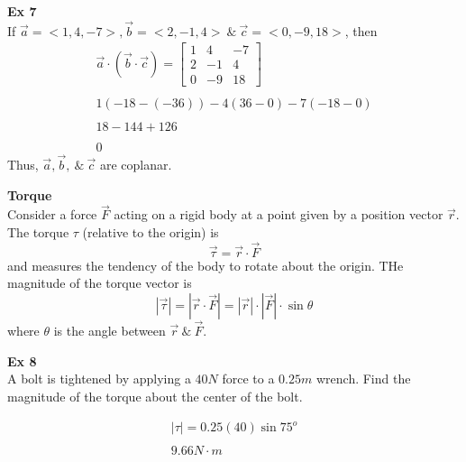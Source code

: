 \documentclass{article}
\begin{document}
    \textbf{Ex 7}\\
    If $ \vec{a} = < 1, 4, -7>, \vec{b}= < 2, -1, 4> ~\&~ \vec{c}= < 0, -9, 18>  $, then
    \[
      \begin{gathered}
      \vec{a} \cdot  (\vec{b} \cdot  \vec{c}) = 
      \begin{bmatrix}
        1 &4 &-7\\
        2 &-1 &4\\
        0 &-9 &18
      \end{bmatrix}\\
      ~\\
      1(-18-(-36))-4(36-0)-7(-18-0)\\
      ~\\
      18-144+126\\
      ~\\
      0
      \end{gathered}
    \]
    Thus, $ \vec{a}, \vec{b}, ~\&~\vec{c} $ are coplanar.

    \textbf{Torque}\\
    Consider a force $ \vec{F} $ acting on a rigid body at a point given by a position vector $\vec{r}$. The torque $ \tau $ (relative to the origin) is
    \[
      \vec{\tau}=\vec{r} \cdot  \vec{F}
    \]
    and measures the tendency of the body to rotate about the origin. THe magnitude of the torque vector is
    \[
    | \vec{\tau}| =| \vec{r} \cdot  \vec{F} | = |\vec{r}| \cdot  | \vec{F} | \cdot \sin{\theta}
    \]
    where $ \theta $ is the angle between $ \vec{r} ~\&~\vec{F} $.

    \textbf{Ex 8}\\
    A bolt is tightened by applying a $ 40N $ force to a $ 0.25m $ wrench. Find the magnitude of the torque about the center of the bolt. 

    \[
      \begin{gathered}
      | \tau | = 0.25(40) \sin{75^o}\\
      ~\\
      \boxed{9.66N\cdot m}
      \end{gathered}
    \]
    
    
\end{document}
